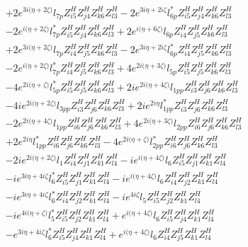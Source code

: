 \begin{align}
 &+2 e^{3 i \Big(\eta +2 \zeta \Big)} l_{7p} Z_{{i 5}}^{H} Z_{{j 4}}^{H} Z_{{k 6}}^{H} Z_{{l 3}}^{H} -2 e^{3 i \eta +2 i \zeta } l_{6p}^* Z_{{i 5}}^{H} Z_{{j 4}}^{H} Z_{{k 6}}^{H} Z_{{l 3}}^{H} \nonumber \\ 
 &-2 e^{i \Big(\eta +2 \zeta \Big)} l_{7p}^* Z_{{i 5}}^{H} Z_{{j 4}}^{H} Z_{{k 6}}^{H} Z_{{l 3}}^{H} +2 e^{i \Big(\eta +6 \zeta \Big)} l_{6p} Z_{{i 4}}^{H} Z_{{j 5}}^{H} Z_{{k 6}}^{H} Z_{{l 3}}^{H} \nonumber \\ 
 &+2 e^{3 i \Big(\eta +2 \zeta \Big)} l_{7p} Z_{{i 4}}^{H} Z_{{j 5}}^{H} Z_{{k 6}}^{H} Z_{{l 3}}^{H} -2 e^{3 i \eta +2 i \zeta } l_{6p}^* Z_{{i 4}}^{H} Z_{{j 5}}^{H} Z_{{k 6}}^{H} Z_{{l 3}}^{H} \nonumber \\ 
 &-2 e^{i \Big(\eta +2 \zeta \Big)} l_{7p}^* Z_{{i 4}}^{H} Z_{{j 5}}^{H} Z_{{k 6}}^{H} Z_{{l 3}}^{H} +4 e^{2 i \Big(\eta +3 \zeta \Big)} l_{5p} Z_{{i 5}}^{H} Z_{{j 5}}^{H} Z_{{k 6}}^{H} Z_{{l 3}}^{H} \nonumber \\ 
 &-4 e^{2 i \Big(\eta +\zeta \Big)} l_{5p}^* Z_{{i 5}}^{H} Z_{{j 5}}^{H} Z_{{k 6}}^{H} Z_{{l 3}}^{H} +2 i e^{2 i \Big(\eta +4 \zeta \Big)} l_{1pp} Z_{{i 3}}^{H} Z_{{j 6}}^{H} Z_{{k 6}}^{H} Z_{{l 3}}^{H} \nonumber \\ 
 &-4 i e^{2 i \Big(\eta +2 \zeta \Big)} l_{3pp} Z_{{i 3}}^{H} Z_{{j 6}}^{H} Z_{{k 6}}^{H} Z_{{l 3}}^{H} +2 i e^{2 i \eta } l_{1pp}^* Z_{{i 3}}^{H} Z_{{j 6}}^{H} Z_{{k 6}}^{H} Z_{{l 3}}^{H} \nonumber \\ 
 &-2 e^{2 i \Big(\eta +4 \zeta \Big)} l_{1pp} Z_{{i 6}}^{H} Z_{{j 6}}^{H} Z_{{k 6}}^{H} Z_{{l 3}}^{H} +4 e^{2 i \Big(\eta +3 \zeta \Big)} l_{2pp} Z_{{i 6}}^{H} Z_{{j 6}}^{H} Z_{{k 6}}^{H} Z_{{l 3}}^{H} \nonumber \\ 
 &+2 e^{2 i \eta } l_{1pp}^* Z_{{i 6}}^{H} Z_{{j 6}}^{H} Z_{{k 6}}^{H} Z_{{l 3}}^{H} -4 e^{2 i \Big(\eta +\zeta \Big)} l_{2pp}^* Z_{{i 6}}^{H} Z_{{j 6}}^{H} Z_{{k 6}}^{H} Z_{{l 3}}^{H} \nonumber \\ 
 &-2 i e^{2 i \Big(\eta +2 \zeta \Big)} l_1 Z_{{i 4}}^{H} Z_{{j 1}}^{H} Z_{{k 1}}^{H} Z_{{l 4}}^{H} -i e^{i \Big(\eta +4 \zeta \Big)} l_6 Z_{{i 5}}^{H} Z_{{j 1}}^{H} Z_{{k 1}}^{H} Z_{{l 4}}^{H} \nonumber \\ 
 &-i e^{3 i \eta +4 i \zeta } l_6^* Z_{{i 5}}^{H} Z_{{j 1}}^{H} Z_{{k 1}}^{H} Z_{{l 4}}^{H} -i e^{i \Big(\eta +4 \zeta \Big)} l_6 Z_{{i 4}}^{H} Z_{{j 2}}^{H} Z_{{k 1}}^{H} Z_{{l 4}}^{H} \nonumber \\ 
 &-i e^{3 i \eta +4 i \zeta } l_6^* Z_{{i 4}}^{H} Z_{{j 2}}^{H} Z_{{k 1}}^{H} Z_{{l 4}}^{H} -i e^{4 i \zeta } l_5 Z_{{i 5}}^{H} Z_{{j 2}}^{H} Z_{{k 1}}^{H} Z_{{l 4}}^{H} \nonumber \\ 
 &-i e^{4 i \Big(\eta +\zeta \Big)} l_5^* Z_{{i 5}}^{H} Z_{{j 2}}^{H} Z_{{k 1}}^{H} Z_{{l 4}}^{H} +e^{i \Big(\eta +4 \zeta \Big)} l_6 Z_{{i 5}}^{H} Z_{{j 4}}^{H} Z_{{k 1}}^{H} Z_{{l 4}}^{H} \nonumber \\ 
 &- e^{3 i \eta +4 i \zeta } l_6^* Z_{{i 5}}^{H} Z_{{j 4}}^{H} Z_{{k 1}}^{H} Z_{{l 4}}^{H} +e^{i \Big(\eta +4 \zeta \Big)} l_6 Z_{{i 4}}^{H} Z_{{j 5}}^{H} Z_{{k 1}}^{H} Z_{{l 4}}^{H} \nonumber 
\end{align} 
